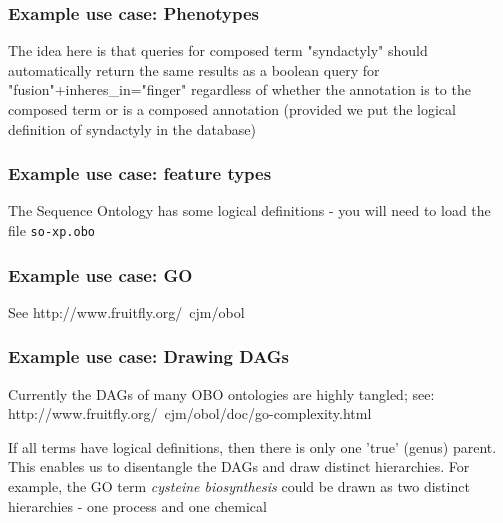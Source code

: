 \subsubsection{Example use case: Phenotypes}

The idea here is that queries for composed term "syndactyly" should
automatically return the same results as a boolean query for
"fusion"+inheres_in="finger" regardless of whether the annotation is
to the composed term or is a composed annotation (provided we put the
logical definition of syndactyly in the database)

\subsubsection{Example use case: feature types}

The Sequence Ontology has some logical definitions - you will need to
load the file {\tt so-xp.obo}

\subsubsection{Example use case: GO}

See
http://www.fruitfly.org/~cjm/obol

\subsubsection{Example use case: Drawing DAGs}

Currently the DAGs of many OBO ontologies are highly tangled; see:
http://www.fruitfly.org/~cjm/obol/doc/go-complexity.html

If all terms have logical definitions, then there is only one 'true'
(genus) \isa parent. This enables us to disentangle the DAGs and draw
distinct hierarchies. For example, the GO term {\em cysteine
biosynthesis} could be drawn as two distinct hierarchies - one process
and one chemical
